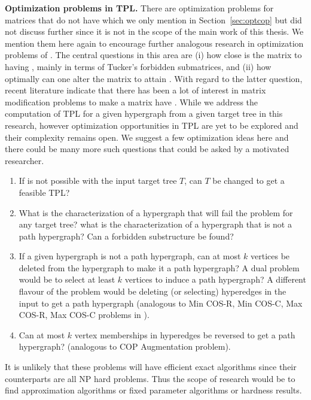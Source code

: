 \textbf{Optimization problems in TPL.}  There are optimization
problems for matrices that do not have \COP which we only mention in
Section~\ref{sec:optcop} but did not discuss further since it is not
in the scope of the main work of this thesis. We mention them here
again to encourage further analogous research in optimization problems
of \TPL.  The central questions in this area are (i) how close is the
matrix to having \COP, mainly in terms of Tucker's forbidden
submatrices, and (ii) how optimally can one alter the matrix to attain
\COP.  With regard to the latter question, recent literature indicate
that there has been a lot of interest in matrix modification problems
to make a matrix have \COP \cite{hg02, tz07}. While we address the
computation of TPL for a given hypergraph from a given target tree in
this research, however optimization opportunities in TPL are yet to be
explored and their complexity remains open. We suggest a few
optimization ideas here and there could be many more such questions
that could be asked by a motivated researcher. 
\begin{enumerate}
\item If \CFTPL is not possible with the input target tree $T$, 
  can $T$ be changed to get a feasible TPL?
\item What is the characterization of a hypergraph that will fail the
  \CFTPL problem for any target tree? \ie what is the characterization
  of a hypergraph that is not a path hypergraph? Can a forbidden
  substructure be found?
\item If a given hypergraph is not a path hypergraph, can at most $k$
  vertices be deleted from the hypergraph to make it a path
  hypergraph? A dual problem would be to select at least $k$ vertices
  to induce a path hypergraph? A different flavour of the problem
  would be deleting (or selecting) hyperedges in the input to get a
  path hypergraph (analogous to {\sc Min COS-R, Min COS-C, Max
    COS-R, Max COS-C} problems in \COP).
\item Can at most $k$ vertex memberships in hyperedges be
  reversed to get a path hypergraph? (analogous to {\sc COP
    Augmentation} problem).
\end{enumerate}
It is unlikely that these problems will have efficient exact
algorithms since their \COP counterparts are all NP hard
problems. Thus the scope of research would be to find approximation
algorithms or fixed parameter algorithms or hardness results.



